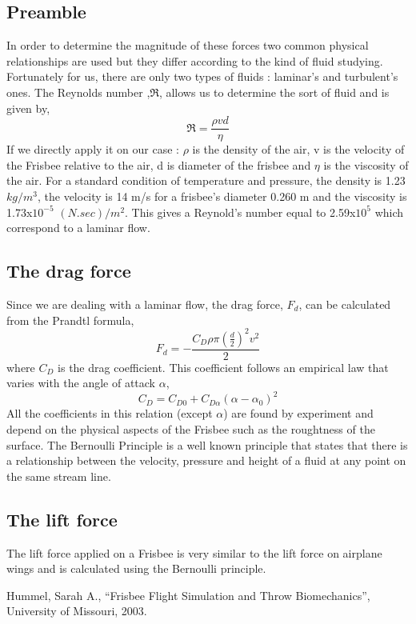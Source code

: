 \documentclass[10pt,a4paper]{report}
\begin{document}
\subsection{Preamble}
In order to determine the magnitude of these forces two common physical relationships are used but they differ according to the kind of fluid studying. Fortunately for us, there are only two types of fluids : laminar's and turbulent's ones. The Reynolds number ,$\Re$, allows us to determine the sort of fluid and is given by,
\[\Re = \frac{\rho v d}{\eta}\]
If we directly apply it on our case : $\rho$ is the density of the air, v is the velocity of the Frisbee relative to the air, d is diameter of the frisbee and $\eta$ is the viscosity of the air. For a standard condition of temperature and pressure, the density is 1.23 $kg/m^3$, the velocity is 14 m/s for a frisbee's diameter 0.260 m and the viscosity is 1.73x$10^{-5}$ $(N.sec)/m^2$. This gives a Reynold's number equal to 2.59x$10^5$ which correspond to a laminar flow.

\subsection{The drag force}

Since we are dealing with a laminar flow, the drag force, $F_d$, can be calculated from the Prandtl formula,
\[F_d = - \frac{C_D \rho \pi \left(\frac{d}{2}\right)^2 v^2}{2}\]
where $C_D$ is the drag coefficient. This coefficient follows an empirical law\cite{art1} that varies with the angle of attack $\alpha$,
\[C_D = C_{D0} + C_{D\alpha}(\alpha-\alpha_0)^2\]
All the coefficients in this relation (except $\alpha$) are found by experiment and depend on the physical aspects of the Frisbee such as the roughtness of the surface.
The Bernoulli Principle is a well known principle that states that there is a relationship between the velocity, pressure and height of a fluid at any point on the same stream line.

\subsection{The lift force}

The lift force applied on a Frisbee is very similar to the lift force on
airplane wings and is calculated using the Bernoulli principle.

\begin{thebibliography}{9}

  Hummel, Sarah A.,
  “Frisbee Flight Simulation and Throw Biomechanics”,
  University of Missouri,
  2003.

\end{thebibliography}
\end{document}
